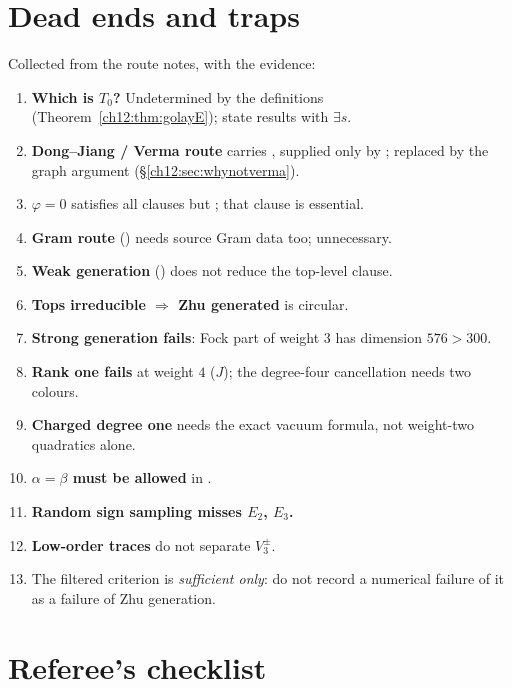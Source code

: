 \section{Dead ends and traps}\label{ch12:sec:deadends}

\begin{warning}
Collected from the route notes, with the evidence:
\begin{enumerate}
\item \textbf{Which  is $T_0$?}  Undetermined by the definitions
  (Theorem~\ref{ch12:thm:golayE}); state results with $\exists s$.
\item \textbf{Dong--Jiang / Verma route} carries , supplied only by ;
  replaced by the graph argument (\S\ref{ch12:sec:whynotverma}).
\item \textbf{$\varphi=0$} satisfies all clauses but ; that clause is essential.
\item \textbf{Gram route} () needs source Gram data too; unnecessary.
\item \textbf{Weak generation} () does not reduce the top-level clause.
\item \textbf{Tops irreducible $\Rightarrow$ Zhu generated} is circular.
\item \textbf{Strong generation fails}: Fock part of weight $3$ has dimension $576>300$.
\item \textbf{Rank one fails} at weight $4$ ($J$); the degree-four cancellation needs two colours.
\item \textbf{Charged degree one} needs the exact vacuum formula, not weight-two quadratics alone.
\item \textbf{$\alpha=\beta$ must be allowed} in .
\item \textbf{Random sign sampling misses $E_2$, $E_3$.}
\item \textbf{Low-order traces} do not separate $V_3^\pm$.
\item The filtered criterion is \emph{sufficient only}: do not record a numerical failure of it as a
  failure of Zhu generation.
\end{enumerate}
\end{warning}

\section{Referee's checklist}\label{ch12:sec:checklist}

